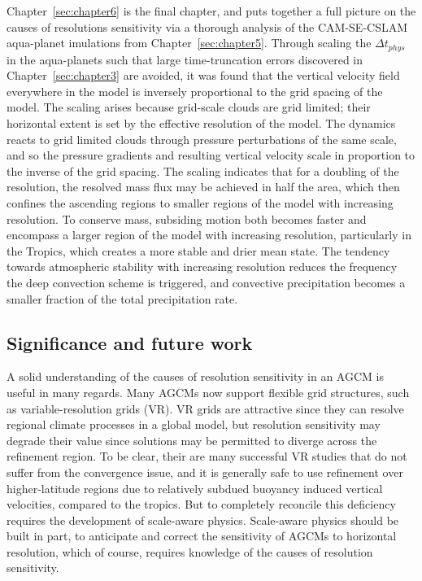 Chapter~\ref{sec:chapter6} is the final chapter, and puts together a full picture on the causes of resolutions sensitivity via a thorough analysis of the CAM-SE-CSLAM aqua-planet imulations from Chapter~\ref{sec:chapter5}. Through scaling the $\Delta t_{phys}$ in the aqua-planets such that large time-truncation errors discovered in Chapter~\ref{sec:chapter3} are avoided, it was found that the vertical velocity field everywhere in the model is inversely proportional to the grid spacing of the model. The scaling arises because grid-scale clouds are grid limited; their horizontal extent is set by the effective resolution of the model. The dynamics reacts to grid limited clouds through pressure perturbations of the same scale, and so the pressure gradients and resulting vertical velocity scale in proportion to the inverse of the grid spacing. The scaling indicates that for a doubling of the resolution, the resolved mass flux may be achieved in half the area, which then confines the ascending regions to smaller regions of the model with increasing resolution. To conserve mass, subsiding motion both becomes faster and encompass a larger region of the model with increasing resolution, particularly in the Tropics, which creates a more stable and drier mean state. The tendency towards atmospheric stability with increasing resolution reduces the frequency the deep convection scheme is triggered, and convective precipitation becomes a smaller fraction of the total precipitation rate.

\subsection{Significance and future work}

A solid understanding of the causes of resolution sensitivity in an AGCM is useful in many regards. Many AGCMs now support flexible grid structures, such as variable-resolution grids (VR). VR grids are attractive since they can resolve regional climate processes in a global model, but resolution sensitivity may degrade their value since solutions may be permitted to diverge across the refinement region. To be clear, their are many successful VR studies that do not suffer from the convergence issue, and it is generally safe to use refinement over higher-latitude regions due to relatively subdued buoyancy induced vertical velocities, compared to the tropics. But to completely reconcile this deficiency requires the development of scale-aware physics. Scale-aware physics should be built in part, to anticipate and correct the sensitivity of AGCMs to horizontal resolution, which of course, requires knowledge of the causes of resolution sensitivity.

